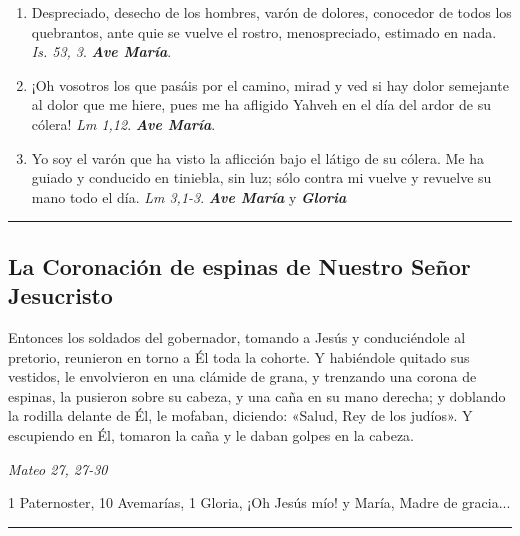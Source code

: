 \documentclass[11pt,a4paper]{book}
\begin{document}
\begin{enumerate}
            \item Despreciado, desecho de los hombres, varón de dolores, conocedor de todos los quebrantos, ante quie se vuelve el rostro, menospreciado, estimado en nada. 
            \emph{Is. 53, 3}. \textbf{\emph{Ave María}}.

        \item ¡Oh vosotros los que pasáis por el camino, mirad y ved si hay dolor semejante al dolor que me hiere, 
            pues me ha afligido Yahveh en el día del ardor de su cólera! \emph{Lm 1,12}. \textbf{\emph{Ave María}}.

        \item Yo soy el varón que ha visto la aflicción bajo el látigo de su cólera. Me ha guiado y conducido en tiniebla, 
            sin luz; sólo contra mi vuelve y revuelve su mano todo el día. \emph{Lm 3,1-3}. \textbf{\emph{Ave María}} y \textbf{\emph{Gloria}}

    \end{enumerate}

    \rule{\textwidth}{0.5pt}
    

    \subsection*{La Coronación de espinas de Nuestro Señor Jesucristo}

    Entonces los soldados del gobernador, tomando a Jesús y conduciéndole al pretorio, 
    reunieron en torno a Él toda la cohorte. Y habiéndole quitado sus vestidos, le envolvieron en una clámide de grana, 
    y trenzando una corona de espinas, la pusieron sobre su cabeza, y una caña en su mano derecha; 
    y doblando la rodilla delante de Él, le mofaban, diciendo: «Salud, Rey de los judíos». 
    Y escupiendo en Él, tomaron la caña y le daban golpes en la cabeza.

    \begin{flushright}
        \emph{Mateo 27, 27-30}
    \end{flushright}    

    1 Paternoster, 10 Avemarías, 1 Gloria, ¡Oh Jesús mío! y María, Madre de gracia...

    \rule{\textwidth}{0.5pt}
\end{document}
